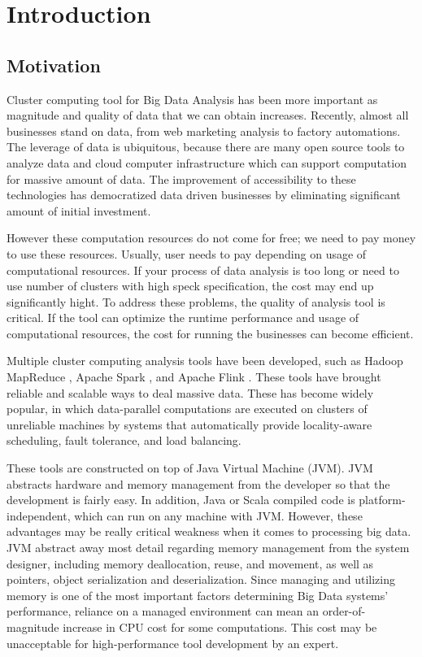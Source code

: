 \chapter{Introduction}
\label{chapter:Introduction}
\thispagestyle{myheadings}


\section{Motivation}
\label{sec:motivation}
Cluster computing tool for Big Data Analysis has been more important as magnitude and quality of data that we can obtain increases. 
Recently, almost all businesses stand on data, from web marketing analysis to factory automations. The leverage of data is ubiquitous, because 
there are many open source tools to analyze data and cloud computer infrastructure which can support computation for massive amount of data. 
The improvement of accessibility to these technologies has democratized data driven businesses by 
eliminating significant amount of initial investment. 

However these computation resources do not come for free; we need to pay money to use these resources. Usually, user needs to pay depending on usage of computational resources. 
If your process of data analysis is too long or need to use number of clusters with high speck specification, the cost may end up significantly hight.
To address these problems, the quality of analysis tool is critical. If the tool can optimize the runtime performance and usage of computational resources, 
the cost for running the businesses can become efficient.

Multiple cluster computing analysis tools have been developed, such as Hadoop MapReduce \cite{ApacheHadoopHomePage}, 
Apache Spark \cite{ApacheSparkHomePage}, and Apache Flink \cite{ApacheFlinkHomePage} \cite{DBLP:journals/debu/CarboneKEMHT15}. 
These tools have brought reliable and scalable ways to deal massive data. 
These has become widely popular, in which data-parallel computations are executed on clusters of unreliable machines by systems that automatically provide locality-aware scheduling, 
fault tolerance, and load balancing. 

These tools are constructed on top of Java Virtual Machine (JVM). JVM abstracts hardware and memory management from the developer so that the development is fairly easy. 
In addition, Java or Scala compiled code is platform-independent, which can run on any machine with JVM. However, these advantages may be really critical weakness when it comes to 
processing big data. JVM abstract away most detail regarding memory management from the system designer, including memory deallocation, reuse, and movement, as well as pointers, 
object serialization and deserialization. Since managing and utilizing memory is one of the most important factors determining Big Data systems' performance, 
reliance on a managed environment can mean an order-of-magnitude increase in CPU cost for some computations. This cost may be unacceptable for high-performance tool development by an expert.

